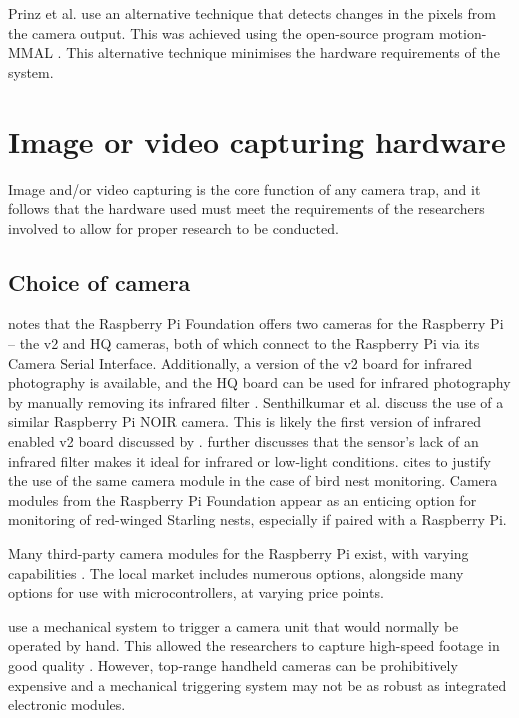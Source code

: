 \documentclass[class=report,11pt,crop=false]{standalone}
\begin{document}
Prinz et al. \cite{prinz2016a} use an alternative technique that detects changes in the pixels from the camera output. This was achieved using the open-source program motion-MMAL \cite{prinz2016a}. This alternative technique minimises the hardware requirements of the system.


\section{Image or video capturing hardware}

Image and/or video capturing is the core function of any camera trap, and it follows that the hardware used must meet the requirements of the researchers involved to allow for proper research to be conducted.

\subsection{Choice of camera}

\cite{jolles2021broad-scale} notes that the Raspberry Pi Foundation offers two cameras for the Raspberry Pi -- the v2 and HQ cameras, both of which connect to the Raspberry Pi via its Camera Serial Interface. Additionally, a version of the v2 board for infrared photography is available, and the HQ board can be used for infrared photography by manually removing its infrared filter \cite{jolles2021broad-scale}. Senthilkumar et al. \cite{senthilkumar2014embedded} discuss the use of a similar Raspberry Pi NOIR camera. This is likely the first version of infrared enabled v2 board discussed by \cite{jolles2021broad-scale}. \cite{senthilkumar2014embedded} further discusses that the sensor's lack of an infrared filter makes it ideal for infrared or low-light conditions. \cite{prinz2016a} cites \cite{senthilkumar2014embedded} to justify the use of the same camera module in the case of bird nest monitoring. Camera modules from the Raspberry Pi Foundation appear as an enticing option for monitoring of red-winged Starling nests, especially if paired with a Raspberry Pi.

Many third-party camera modules for the Raspberry Pi exist, with varying capabilities \cite{jolles2021broad-scale}. The local market includes numerous options, alongside many options for use with microcontrollers, at varying price points.

\cite{rico-guevara2017bring} use a mechanical system to trigger a camera unit that would normally be operated by hand. This allowed the researchers to capture high-speed footage in good quality \cite{rico-guevara2017bring}. However, top-range handheld cameras can be prohibitively expensive and a mechanical triggering system may not be as robust as integrated electronic modules.
\end{document}
